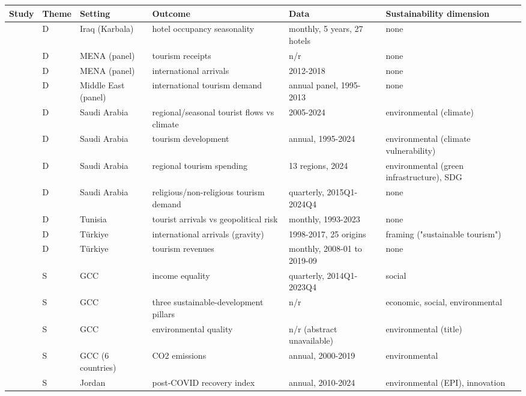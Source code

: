 \begin{tabularx}{\linewidth}{@{}p{3.2cm}p{1.0cm}p{3.4cm}p{5.2cm}p{4.3cm}p{5.0cm}@{}}
\toprule
Study & Theme & Setting & Outcome & Data & Sustainability dimension\\
\midrule
\citet{Shmoto2026} & D & Iraq (Karbala) & hotel occupancy seasonality & monthly, 5 years, 27 hotels & none \\
\citet{Kisswani2020} & D & MENA (panel) & tourism receipts & n/r & none \\
\citet{Wada2021} & D & MENA (panel) & international arrivals & 2012-2018 & none \\
\citet{Rafiei2018} & D & Middle East (panel) & international tourism demand & annual panel, 1995-2013 & none \\
\citet{Chouari2025} & D & Saudi Arabia & regional/seasonal tourist flows vs climate & 2005-2024 & environmental (climate) \\
\citet{Abuhulaibah2026} & D & Saudi Arabia & tourism development & annual, 1995-2024 & environmental (climate vulnerability) \\
\citet{Alfehaid2026} & D & Saudi Arabia & regional tourism spending & 13 regions, 2024 & environmental (green infrastructure), SDG \\
\citet{Mabrouk2026} & D & Saudi Arabia & religious/non-religious tourism demand & quarterly, 2015Q1-2024Q4 & none \\
\citet{Hamida2025} & D & Tunisia & tourist arrivals vs geopolitical risk & monthly, 1993-2023 & none \\
\citet{Ulucak2020} & D & T\"urkiye & international arrivals (gravity) & 1998-2017, 25 origins & framing ("sustainable tourism") \\
\citet{Agazade2021} & D & T\"urkiye & tourism revenues & monthly, 2008-01 to 2019-09 & none \\
\citet{Alnafisah2025} & S & GCC & income equality & quarterly, 2014Q1-2023Q4 & social \\
\citet{Zmami2024} & S & GCC & three sustainable-development pillars & n/r & economic, social, environmental \\
\citet{Farooq2023b} & S & GCC & environmental quality & n/r (abstract unavailable) & environmental (title) \\
\citet{Farooq2023a} & S & GCC (6 countries) & CO2 emissions & annual, 2000-2019 & environmental \\
\citet{Harazneh2026} & S & Jordan & post-COVID recovery index & annual, 2010-2024 & environmental (EPI), innovation \\

\end{tabularx}
